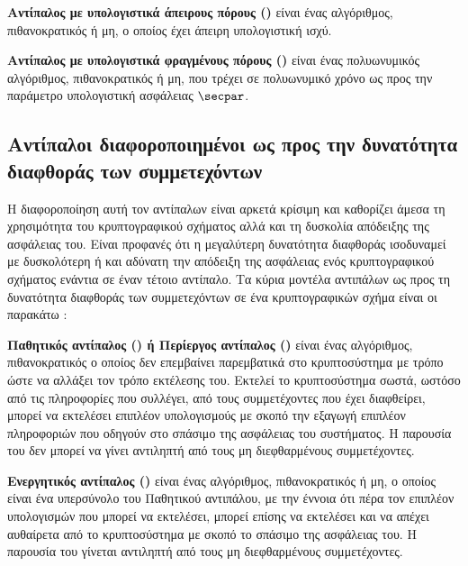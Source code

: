 \begin{definition}
\textbf{Αντίπαλος με υπολογιστικά άπειρους πόρους ()} είναι ένας αλγόριθμος, πιθανοκρατικός ή μη, ο οποίος έχει άπειρη υπολογιστική ισχύ.
\end{definition}

\begin{definition}
\textbf{Αντίπαλος με υπολογιστικά φραγμένους πόρους ()} είναι ένας πολυωνυμικός αλγόριθμος, πιθανοκρατικός ή μη, που τρέχει σε πολυωνυμικό χρόνο ως προς την παράμετρο υπολογιστική ασφάλειας $\secpar$.
\end{definition}

\subsection{Αντίπαλοι διαφοροποιημένοι ως προς την δυνατότητα διαφθοράς των συμμετεχόντων}

Η διαφοροποίηση αυτή τον αντίπαλων είναι αρκετά κρίσιμη και καθορίζει άμεσα τη χρησιμότητα του κρυπτογραφικού σχήματος αλλά και τη δυσκολία απόδειξης της ασφάλειας του. Είναι προφανές ότι η μεγαλύτερη δυνατότητα διαφθοράς ισοδυναμεί με δυσκολότερη ή και αδύνατη την απόδειξη της ασφάλειας ενός κρυπτογραφικού σχήματος ενάντια σε έναν τέτοιο αντίπαλο. Τα κύρια μοντέλα αντιπάλων ως προς τη δυνατότητα διαφθοράς των συμμετεχόντων σε ένα κρυπτογραφικών σχήμα είναι οι παρακάτω :

\begin{definition}
\textbf{Παθητικός αντίπαλος () ή Περίεργος αντίπαλος ()} είναι ένας αλγόριθμος, πιθανοκρατικός ο οποίος δεν επεμβαίνει παρεμβατικά στο κρυπτοσύστημα με τρόπο ώστε να αλλάξει τον τρόπο εκτέλεσης του. Εκτελεί το κρυπτοσύστημα σωστά, ωστόσο από τις πληροφορίες που συλλέγει, από τους συμμετέχοντες που έχει διαφθείρει, μπορεί να εκτελέσει επιπλέον υπολογισμούς με σκοπό την εξαγωγή επιπλέον πληροφοριών που οδηγούν στο σπάσιμο της ασφάλειας του συστήματος. Η παρουσία του δεν μπορεί να γίνει αντιληπτή από τους μη διεφθαρμένους συμμετέχοντες.
\end{definition}

\begin{definition}
\textbf{Ενεργητικός αντίπαλος ()} είναι ένας αλγόριθμος, πιθανοκρατικός ή μη, ο οποίος είναι ένα υπερσύνολο του Παθητικού αντιπάλου, με την έννοια ότι πέρα τον επιπλέον υπολογισμών που μπορεί να εκτελέσει, μπορεί επίσης να εκτελέσει και να απέχει αυθαίρετα από το κρυπτοσύστημα με σκοπό το σπάσιμο της ασφάλειας του. Η παρουσία του γίνεται αντιληπτή από τους μη διεφθαρμένους συμμετέχοντες.
\end{definition}

